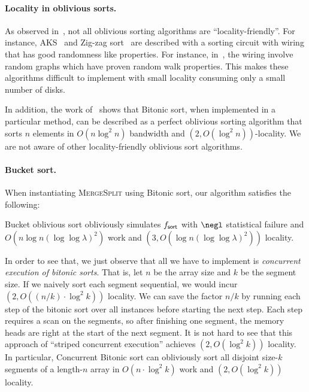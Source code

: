 \paragraph{Locality in oblivious sorts.}
As observed in~\cite{AsharovCNPRS19}, not all oblivious sorting
algorithms are ``locality-friendly''. For instance,
AKS~\cite{aks} and Zig-zag sort~\cite{zigzag} are described with a sorting circuit with wiring that has good randomness like properties. For instance, in~\cite{aks}, the wiring involve random graphs which have proven random walk properties. This makes these algorithms difficult to implement with small locality consuming only a small number of disks. 

In addition, the work of~\cite{AsharovCNPRS19} shows that Bitonic sort, when implemented in a particular method, can be described as a perfect oblivious sorting algorithm that sorts $n$ elements in $O(n \log^2 n)$ bandwidth and $(2,O(\log^2n))$-locality. 
%
We are not aware of other locality-friendly oblivious sort algorithms. 

\paragraph{Bucket sort.} 
When instantiating \textsc{MergeSplit} using Bitonic sort, our algorithm satisfies the following:

\begin{theorem} 
Bucket oblivious sort obliviously simulates $f_{\sf sort}$ with $\negl$ statistical failure and $O(n \log n (\log\log\lambda)^2)$ work and $(3, O(\log n (\log\log\lambda)^2))$ locality. 
\end{theorem}

In order to see that, we just observe that all we have to implement is \emph{concurrent execution of bitonic sorts}. That is, let $n$ be the array size and $k$ be the segment size.
If we naively sort each segment sequential, we would incur $(2, O((n/k) \cdot \log^2 k))$ locality. 
We can save the factor $n/k$ by running each step of the bitonic sort over all instances before starting the next step. 
Each step requires a scan on the segments, so after finishing one segment, the memory heads are right at the start of the next segment.
It is not hard to see that this approach of ``striped concurrent execution''
achieves $(2, O(\log^2 k))$ locality. In particular, 
Concurrent Bitonic sort can obliviously sort all disjoint size-$k$ segments
of a length-$n$ array in $O(n \cdot \log^2 k)$ work and $(2,O(\log^2k))$ locality.


